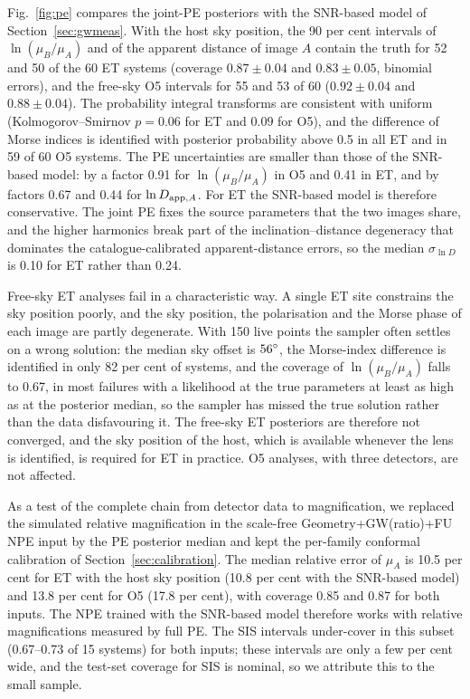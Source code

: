 Fig.~\ref{fig:pe} compares the joint-PE posteriors with the SNR-based model of Section~\ref{sec:gwmeas}. With the host sky position, the 90 per cent intervals of $\ln(\mu_B/\mu_A)$ and of the apparent distance of image $A$ contain the truth for 52 and 50 of the 60 ET systems (coverage $0.87\pm0.04$ and $0.83\pm0.05$, binomial errors), and the free-sky O5 intervals for 55 and 53 of 60 ($0.92\pm0.04$ and $0.88\pm0.04$). The probability integral transforms are consistent with uniform (Kolmogorov--Smirnov $p=0.06$ for ET and $0.09$ for O5), and the difference of Morse indices is identified with posterior probability above 0.5 in all ET and in 59 of 60 O5 systems. The PE uncertainties are smaller than those of the SNR-based model: by a factor 0.91 for $\ln(\mu_B/\mu_A)$ in O5 and 0.41 in ET, and by factors 0.67 and 0.44 for $\ln D_{{\rm app},A}$. For ET the SNR-based model is therefore conservative. The joint PE fixes the source parameters that the two images share, and the higher harmonics break part of the inclination--distance degeneracy that dominates the catalogue-calibrated apparent-distance errors, so the median $\sigma_{\ln D}$ is 0.10 for ET rather than 0.24.

Free-sky ET analyses fail in a characteristic way. A single ET site constrains the sky position poorly, and the sky position, the polarisation and the Morse phase of each image are partly degenerate. With 150 live points the sampler often settles on a wrong solution: the median sky offset is $56\hbox{$^\circ$}$, the Morse-index difference is identified in only 82 per cent of systems, and the coverage of $\ln(\mu_B/\mu_A)$ falls to 0.67, in most failures with a likelihood at the true parameters at least as high as at the posterior median, so the sampler has missed the true solution rather than the data disfavouring it. The free-sky ET posteriors are therefore not converged, and the sky position of the host, which is available whenever the lens is identified, is required for ET in practice. O5 analyses, with three detectors, are not affected.

As a test of the complete chain from detector data to magnification, we replaced the simulated relative magnification in the scale-free Geometry+GW(ratio)+FU NPE input by the PE posterior median and kept the per-family conformal calibration of Section~\ref{sec:calibration}. The median relative error of $\mu_A$ is 10.5 per cent for ET with the host sky position (10.8 per cent with the SNR-based model) and 13.8 per cent for O5 (17.8 per cent), with coverage 0.85 and 0.87 for both inputs. The NPE trained with the SNR-based model therefore works with relative magnifications measured by full PE. The SIS intervals under-cover in this subset (0.67--0.73 of 15 systems) for both inputs; these intervals are only a few per cent wide, and the test-set coverage for SIS is nominal, so we attribute this to the small sample.

